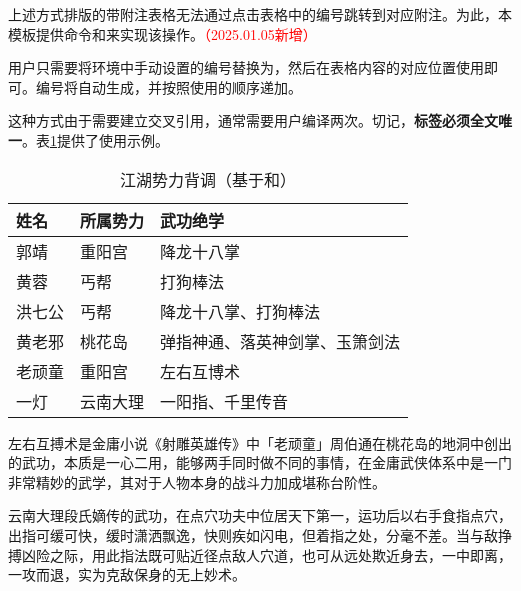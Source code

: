 \documentclass[print, doctor, vlined]{DissertUESTC}
\begin{document}
	上述方式排版的带附注表格无法通过点击表格中的编号跳转到对应附注。为此，本模板提供命令和来实现该操作。\textcolor{red}{（2025.01.05新增）}

	用户只需要将环境中手动设置的编号替换为，然后在表格内容的对应位置使用即可。编号将自动生成，并按照使用的顺序递加。

	这种方式由于需要建立交叉引用，通常需要用户编译两次。切记，\textbf{标签必须全文唯一}。表\ref{tab: 江湖势力背调（基于puttablenotelabel和tablenoteref）}提供了使用示例。

	\begin{table}[!ht]
		\caption{江湖势力背调（基于和）} \label{tab: 江湖势力背调（基于puttablenotelabel和tablenoteref）}
		\begin{threeparttable}
			\begin{tabular}{p{2cm} p{3cm} p{7cm}}
				\toprule
				\textbf{姓名} & \textbf{所属势力} & \textbf{武功绝学} \\
				\midrule
				郭靖 & 重阳宫 & 降龙十八掌 \\
				黄蓉 & 丐帮 & 打狗棒法 \\
				洪七公 & 丐帮 & 降龙十八掌、打狗棒法 \\
				黄老邪 & 桃花岛 & 弹指神通、落英神剑掌、玉箫剑法 \\
				老顽童 & 重阳宫 & 左右互博术\tablenoteref{tn: 左右互搏术} \\
				一灯 & 云南大理 & 一阳指\tablenoteref{tn: 一阳指}、千里传音 \\
				\bottomrule
			\end{tabular}
			\begin{tablenotes}
				\item[\puttablenotelabel{tn: 左右互搏术}] 左右互搏术是金庸小说《射雕英雄传》中「老顽童」周伯通在桃花岛的地洞中创出的武功，本质是一心二用，能够两手同时做不同的事情，在金庸武侠体系中是一门非常精妙的武学，其对于人物本身的战斗力加成堪称台阶性。
				\item[\puttablenotelabel{tn: 一阳指}] 云南大理段氏嫡传的武功，在点穴功夫中位居天下第一，运功后以右手食指点穴，出指可缓可快，缓时潇洒飘逸，快则疾如闪电，但着指之处，分毫不差。当与敌挣搏凶险之际，用此指法既可贴近径点敌人穴道，也可从远处欺近身去，一中即离，一攻而退，实为克敌保身的无上妙术。
			\end{tablenotes}
		\end{threeparttable}
	\end{table}
	
\end{document}
